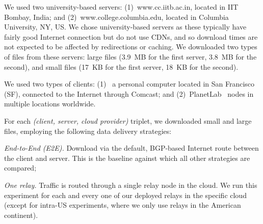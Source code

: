 \documentclass{hotnets17}
\newcommand{\mycomm}[3]{{\color{#2} \textbf{[#1: #3]}}}
\newcommand{\mycomm}[3]{}
\newcommand{\IK}[1]{\mycomm{IK}{blue}{#1}}
\newcommand{\AB}[1]{\mycomm{AB}{Orange}{#1}}
\newcommand{\NR}[1]{\mycomm{NR}{OliveGreen}{#1}}
\def\compactify{\itemsep=0pt \topsep=0pt \partopsep=0pt \parsep=0pt}
\let\latexusecounter=\usecounter
\newenvironment{CompactEnumerate}
    {\def\usecounter{\compactify\latexusecounter}
     \begin{enumerate}}
    {\end{enumerate}\let\usecounter=\latexusecounter}
\newcommand{\U}[1]{\smallskip\noindent\textit{#1}} %
\begin{document}
\smallskip{} We used two university-based servers: 
(1)~www.cc.iitb.ac.in, located in IIT Bombay, India; and (2)~www.college.columbia.edu, located in Columbia University, NY, US.
We chose university-based servers as these typically have fairly good Internet connection but do not use CDNs, and so download times are not expected to be affected by redirections or caching. We downloaded two types of files from these servers: large files (3.9~MB for the first server, 3.8~MB for the second), and small files (17~KB for the first server, 18~KB for the second).

\smallskip{} We used two types of clients: (1)~ a personal computer located in San Francisco (SF), connected to the Internet through Comcast; and (2)~PlanetLab~\cite{PlanetLab} nodes in multiple locations worldwide.

\smallskip{} For each \textit{(client, server, cloud provider)} triplet, we downloaded small and large files, employing the following data delivery strategies:

\U{End-to-End (E2E).} Download via the default, BGP-based Internet route between the client and server. This is the baseline against which all other strategies are compared;

\U{One relay.} Traffic is routed through a single relay node in the cloud. We run this experiment for each and every one of our deployed relays in the specific cloud (except for intra-US experiments, where we only use relays in the American continent).

\end{document}
